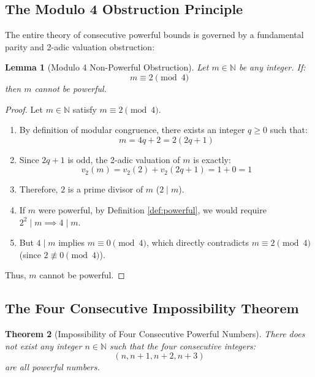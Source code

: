 \documentclass[11pt,a4paper]{article}
\newtheorem{theorem}{Theorem}[section]
\newtheorem{lemma}[theorem]{Lemma}
\theoremstyle{definition}
\begin{document}
\subsection{The Modulo 4 Obstruction Principle}

The entire theory of consecutive powerful bounds is governed by a fundamental parity and 2-adic valuation obstruction:

\begin{lemma}[Modulo 4 Non-Powerful Obstruction]\label{lem:mod4_main}
Let $m \in \mathbb{N}$ be any integer. If:
\begin{equation}\label{eq:mod4_cond}
m \equiv 2 \pmod 4
\end{equation}
then $m$ cannot be powerful.
\end{lemma}

\begin{proof}
Let $m \in \mathbb{N}$ satisfy $m \equiv 2 \pmod 4$.
\begin{enumerate}
    \item By definition of modular congruence, there exists an integer $q \ge 0$ such that:
    \[ m = 4q + 2 = 2(2q + 1) \]
    \item Since $2q+1$ is odd, the 2-adic valuation of $m$ is exactly:
    \[ v_2(m) = v_2(2) + v_2(2q + 1) = 1 + 0 = 1 \]
    \item Therefore, $2$ is a prime divisor of $m$ ($2 \mid m$).
    \item If $m$ were powerful, by Definition \ref{def:powerful}, we would require $2^2 \mid m \implies 4 \mid m$.
    \item But $4 \mid m$ implies $m \equiv 0 \pmod 4$, which directly contradicts $m \equiv 2 \pmod 4$ (since $2 \not\equiv 0 \pmod 4$).
\end{enumerate}
Thus, $m$ cannot be powerful.
\end{proof}

\subsection{The Four Consecutive Impossibility Theorem}

\begin{theorem}[Impossibility of Four Consecutive Powerful Numbers]\label{thm:four_impossible}
There does not exist any integer $n \in \mathbb{N}$ such that the four consecutive integers:
\[ (n, n+1, n+2, n+3) \]
are all powerful numbers.
\end{theorem}
\end{document}
